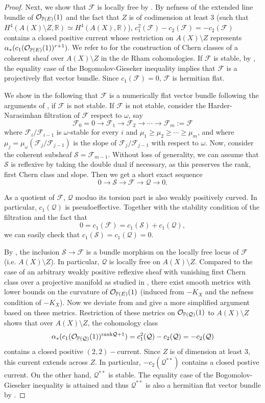 \documentclass[a4, 12pt]{amsart}
\numberwithin{equation}{section}
\theoremstyle{definition}
\def\R{\mathbb{R}}
\def\P{\mathbb{P}}
\def\cF{\mathcal{F}}
\def\P{\mathbb{P}}
\def \rank{\mathrm{rank}}
\def\cS{\mathcal{S}}
\def\cQ{\mathcal{Q}}
\begin{document}
\begin{proof}
Next, we show that $\cF$ is locally free by \cite{BS94}.
By nefness of the extended line bundle of $\cO_{\P(E)}(1)$ and the fact that $Z$ is of codimension at least 3 (such that $H^4(A(X) \setminus Z, \R) \simeq H^4(A(X), \R)$),
$c_1^2(\cF)-c_2(\cF)=-c_2(\cF)$ contains a closed positive current whose restriction on $A(X) \setminus Z$ represents $\alpha_*(c_1(\cO_{\P(E)}(1))^{r+1})$.
We refer to \cite[Remark 1]{Wu23} for the construction of Chern classes of a coherent sheaf over $A(X) \setminus Z$ in the de Rham cohomologies.
If $\cF$ is stable, by \cite[Corollary 3]{BS94}, the equality case of the Bogomolov-Gieseker inequality implies that $\cF$ is a projectively flat vector bundle.
Since $c_1(\cF)=0$, $\cF$ is hermitian flat.


We show in the following that $\cF$ is a numerically flat vector bundle following the arguments of \cite[Proposition 2.7]{CCM21}, if $\cF$ is not stable.
If $\cF$ is not stable, consider the Harder-Narasimhan filtration of $\cF$
respect to $\omega$, say
$$\cF_0=0 \to \cF_1 \to \cF_{2} \to \cdots\to \cF_m:=\cF$$
where $\cF_i /\cF_{i-1}$ is $\omega$-stable for every $i$ and $\mu_1 \geq \mu_2 \geq \cdots \geq \mu_m$, and where $\mu_j=\mu_\omega(\cF_j / \cF_{j-1})$ is the slope of $\cF_j / \cF_{j-1}$ with respect to $\omega$.
Now, consider the coherent subsheaf $\cS=\cF_{m-1}$.
Without loss of generality, we can assume that $\cS$ is reflexive by taking the double dual if necessary, as this preserves the rank, first Chern class and slope. Then we get a short exact sequence
$$0 \to \cS \to \cF \to \cQ \to 0.$$

As a quotient of $\cF$, $\cQ$ moduo its torsion part is also weakly positively curved.
In particular, $c_1(\cQ)$ is pseudoeffective.
Together with the stability condition of the filtration and the fact that
$$0=c_1(\cF)=c_1(\cS)+c_1(\cQ),$$
we can easily
check that $c_1(\cS)=c_1(\cQ)=0$.

By \cite[Corollary 1.19]{DPS94}, the inclusion $\cS \to \cF$ is a bundle morphism on the locally free locus of $\cF$  (i.e. $A(X) \setminus Z$).
In particular, $\cQ$ is locally free on $A(X) \setminus Z$.
Compared to the case of an arbitrary weakly positive reflexive sheaf with vanishing first Chern class over a projective manifold as studied in \cite{CCM21}, there exist smooth metrics with lower bounds on the curvature of $\cO_{\P(E)}(1)$ (induced from $-K_X$ and the nefness condition of $-K_X$).
Now we deviate from \cite{CCM21} and give a more simplified argument based on these metrics.
Restriction of these metrics on $\cO_{\P(\cQ)}(1)$ to $A(X) \setminus Z$
shows that over  $A(X) \setminus Z$, the cohomology class
$$\alpha_*(c_1(\cO_{\P(\cQ)}(1))^{\rank{\cQ}+1})=c_1^2(\cQ)-c_2(\cQ)=-c_2(\cQ)$$
contains a closed positive $(2,2)-$current.
Since $Z$ is of dimension at least 3,
this current extends across $Z$.
In particular, $-c_2(\cQ^{**})$ contains a closed postive current.
On the other hand, $\cQ^{**}$ is stable.
The equality case of the Bogomolov-Gieseker inequality is attained and thus $\cQ^{**}$ is also a hermitian flat vector bundle by \cite{BS94}.


\end{proof}
\end{document}
